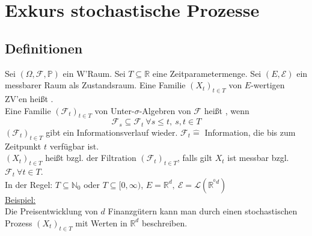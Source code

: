 \section{Exkurs stochastische Prozesse}
\label{sec:stoch_prozesse}

\subsection{Definitionen}
\label{sub:def}
Sei $(\Omega,\mathcal{F},\mathds{P})$ ein W'Raum. Sei $T\subseteq \mathds{R}$ eine Zeitparametermenge. Sei $(E,\mathcal{E})$ ein messbarer Raum als Zustandsraum. Eine Familie $(X_t)_{t \in T}$ von $E$-wertigen ZV'en heißt .\\
Eine Familie $(\mathcal{F}_t)_{t\in T}$ von Unter-$\sigma$-Algebren von $\mathcal{F}$ heißt , wenn \[\mathcal{F}_s\subseteq \mathcal{F}_t~\forall s\le t,~s,t\in T\]
$(\mathcal{F}_t)_{t\in T}$ gibt ein Informationsverlauf wieder. $\mathcal{F}_t \mathrel{\hat{=}}$ Information, die bis zum Zeitpunkt $t$ verfügbar ist.\\
$(X_t)_{t\in T}$ heißt  bzgl. der Filtration $(\mathcal{F}_t)_{t\in T}$, falls gilt $X_t$ ist messbar bzgl. $\mathcal{F}_t~\forall t\in T$.\\ 
In der Regel: $T\subseteq \mathds{N}_0$ oder $T\subseteq [0,\infty)$, $E=\mathds{R}^d,~\mathcal{E}=\mathcal{L}(\mathds{R}^{^0d})$\\

\uline{Beispiel:}\\
Die Preisentwicklung von $d$ Finanzgütern kann man durch einen stochastischen Prozess $(X_t)_{t\in T}$ mit Werten in $\mathds{R}^d$ beschreiben.


